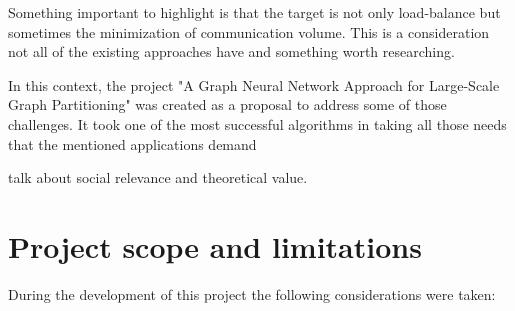 Something important to highlight is that the target is not only load-balance but sometimes the minimization of communication volume. This is a consideration not all of the existing approaches have and something worth researching.


In this context, the project "A Graph Neural Network Approach for Large-Scale Graph Partitioning" was created as a proposal to address some of those challenges. It took one of the most successful algorithms in taking all those needs that the mentioned applications demand

talk about social relevance and theoretical value.

\section{Project scope and limitations}
During the development of this project the following considerations were taken:
